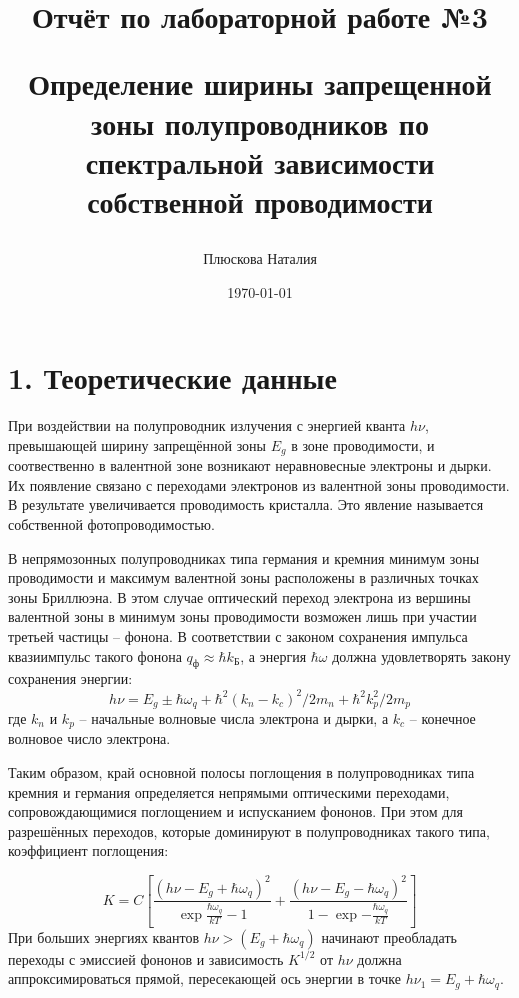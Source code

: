\documentclass[a4paper,12pt]{report}
\title{Отчёт по лабораторной работе №3

Определение ширины запрещенной зоны полупроводников по спектральной зависимости собственной проводимости}
\author{Плюскова Наталия}
\date{\today}
\begin{document}
\maketitle


\section*{1. Теоретические данные}

При воздействии на полупроводник излучения с энергией кванта $h\nu$, превышающей ширину запрещённой зоны $E_g$ в зоне проводимости, и соотвественно в валентной зоне возникают неравновесные электроны и дырки. Их появление связано с переходами электронов из валентной зоны проводимости. В результате увеличивается проводимость кристалла. Это явление называется собственной фотопроводимостью.

    В непрямозонных полупроводниках типа германия и кремния минимум зоны проводимости и максимум валентной зоны расположены в различных точках зоны Бриллюэна. В этом случае оптический переход электрона из вершины валентной зоны в минимум зоны проводимости возможен лишь при участии третьей частицы – фонона. В соответствии с законом сохранения импульса квазиимпульс такого фонона $q_{\text{ф}}\approx\hbar k_{\text{Б}}$, а энергия $\hbar\omega$ должна удовлетворять закону сохранения энергии:
    \begin{equation}
        h\nu = E_g\pm \hbar\omega_q+\hbar^2(k_n-k_c)^2/2m_n+\hbar^2k_p^2/2m_p
    \end{equation}
    где $k_n$ и $k_p$ -- начальные волновые числа электрона и дырки, а $k_c$ -- конечное волновое число электрона.

    Таким образом, край основной полосы поглощения в полупроводниках типа кремния и германия определяется непрямыми оптическими переходами, сопровождающимися поглощением и испусканием фононов. При этом для разрешённых переходов, которые доминируют в полупроводниках такого типа, коэффициент поглощения:

    \begin{equation}
        K=C\left[\frac{(h\nu-E_g+\hbar\omega_q)^2}{\exp{\frac{\hbar\omega_q}{kT}}-1}+\frac{(h\nu-E_g-\hbar\omega_q)^2}{1-\exp{-\frac{\hbar\omega_q}{kT}}}\right]
    \end{equation}
    При больших энергиях квантов $h\nu>(E_g+\hbar\omega_q)$ начинают преобладать переходы с эмиссией фононов и зависимость $K^{1/2}$ от $h\nu$ должна аппроксимироваться прямой, пересекающей ось энергии в точке $h\nu_1=E_g+\hbar\omega_q$.
\end{document}
